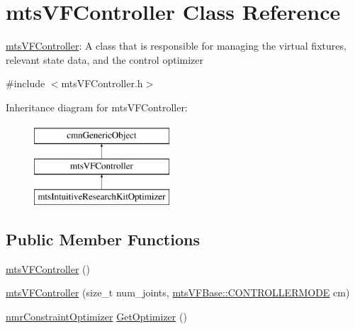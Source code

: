 \hypertarget{classmts_v_f_controller}{}\section{mts\+V\+F\+Controller Class Reference}
\label{classmts_v_f_controller}


\hyperlink{classmts_v_f_controller}{mts\+V\+F\+Controller}\+: A class that is responsible for managing the virtual fixtures, relevant state data, and the control optimizer  




{\ttfamily \#include $<$mts\+V\+F\+Controller.\+h$>$}

Inheritance diagram for mts\+V\+F\+Controller\+:\begin{figure}[H]
\begin{center}
\leavevmode
\includegraphics[height=3.000000cm]{d7/d50/classmts_v_f_controller}
\end{center}
\end{figure}
\subsection*{Public Member Functions}
\begin{DoxyCompactItemize}
\item 
\hyperlink{classmts_v_f_controller_a4852cd5a49f4053999790a3c9fb05b3d}{mts\+V\+F\+Controller} ()
\item 
\hyperlink{classmts_v_f_controller_a6c9766a12eaafd7126ee59f2606d3451}{mts\+V\+F\+Controller} (size\+\_\+t num\+\_\+joints, \hyperlink{classmts_v_f_base_a742dd08f8b70bafeb746cec14d9ee974}{mts\+V\+F\+Base\+::\+C\+O\+N\+T\+R\+O\+L\+L\+E\+R\+M\+O\+D\+E} cm)
\item 
\hyperlink{classnmr_constraint_optimizer}{nmr\+Constraint\+Optimizer} \hyperlink{classmts_v_f_controller_a1e6ca19fdd65c028e1fd78b6f82ea084}{Get\+Optimizer} ()
\end{DoxyCompactItemize}
